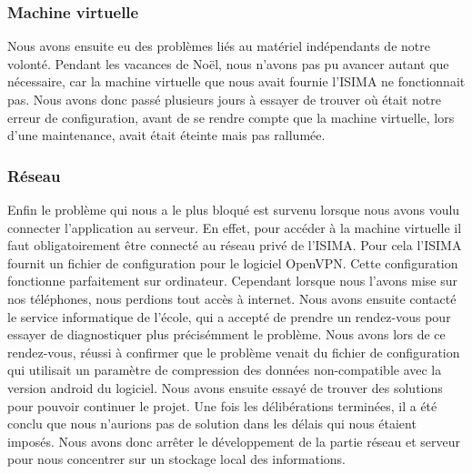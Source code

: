\subsubsection{Machine virtuelle}
Nous avons ensuite eu des problèmes liés au matériel indépendants de notre volonté.
Pendant les vacances de Noël, nous n'avons pas pu avancer autant que nécessaire, car la machine virtuelle que nous avait fournie l'ISIMA ne fonctionnait pas.
Nous avons donc passé plusieurs jours à essayer de trouver où était notre erreur de configuration, avant de se rendre compte que la machine virtuelle, lors d'une maintenance, avait était éteinte mais pas rallumée.
\subsubsection{Réseau}
Enfin le problème qui nous a le plus bloqué est survenu lorsque nous avons voulu connecter l'application au serveur. En effet, pour accéder à la machine virtuelle il faut obligatoirement être connecté au réseau privé de l'ISIMA.
Pour cela l'ISIMA fournit un fichier de configuration pour le logiciel OpenVPN. Cette configuration fonctionne parfaitement sur ordinateur. Cependant lorsque nous l'avons mise sur nos téléphones, nous perdions tout accès à internet.
Nous avons ensuite contacté le service informatique de l'école, qui a accepté de prendre un rendez-vous pour essayer de diagnostiquer plus précisémment le problème. Nous avons lors de ce rendez-vous, réussi à confirmer que le problème venait
du fichier de configuration qui utilisait un paramètre de compression des données non-compatible avec la version android du logiciel. Nous avons ensuite essayé de trouver des solutions pour pouvoir continuer le projet.
Une fois les délibérations terminées, il a été conclu que nous n'aurions pas de solution dans les délais qui nous étaient imposés. Nous avons donc arrêter le développement de la partie réseau et serveur pour nous concentrer sur un stockage local des informations.
